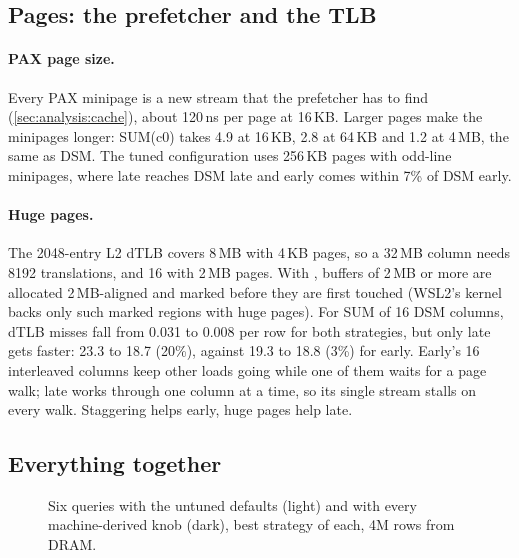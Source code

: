 \subsection{Pages: the prefetcher and the TLB}
\label{sec:tuning:pages}

\paragraph{PAX page size.} Every PAX minipage is a new stream that the prefetcher has to find
(\cref{sec:analysis:cache}), about 120\,ns per page at 16\,KB. Larger pages make the minipages
longer: SUM(c0) takes 4.9\ms{} at 16\,KB, 2.8 at 64\,KB and 1.2 at 4\,MB, the same as DSM. The
tuned configuration uses 256\,KB pages with odd-line minipages, where late 
reaches DSM late and early comes within 7\% of DSM early.

\paragraph{Huge pages.} The 2048-entry L2 dTLB covers 8\,MB with 4\,KB pages, so a 32\,MB column
needs 8192 translations, and 16 with 2\,MB pages. With , buffers of 2\,MB or
more are allocated 2\,MB-aligned and marked  before they are first touched
(WSL2's kernel backs only such marked regions with huge pages). For SUM of 16 DSM columns, dTLB
misses fall from 0.031 to 0.008 per row for both strategies, but only late gets faster: 23.3 to
18.7\ms{} (20\%), against 19.3 to 18.8\ms{} (3\%) for early. Early's 16 interleaved columns keep
other loads going while one of them waits for a page walk; late works through one column at a
time, so its single stream stalls on every walk. Staggering helps early, huge pages help late.

\subsection{Everything together}
\label{sec:tuning:all}

\begin{figure}[t]
\centering
{}
\caption{Six queries with the untuned defaults (light) and with every machine-derived knob
(dark), best strategy of each, 4M rows from DRAM.}
\label{fig:tuned}
\end{figure}

\begin{table}[t]
\centering\small
\caption{Untuned against tuned, in ms. Untuned: 1024-row vectors, page-aligned DSM columns,
4\,KB pages, direct output writes, scalar kernels, 16\,KB PAX pages, and the best of the four
fixed strategies. Tuned: ,
256\,KB PAX pages with , and auto (in this run measuring both strategies,
\cref{sec:tried}). Speedups are over the untuned best.}
\label{tab:tuned}
\end{table}

